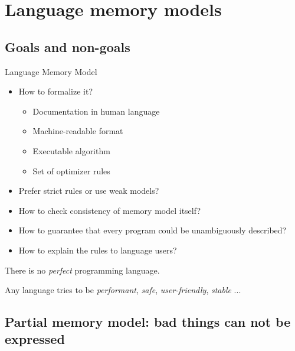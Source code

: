 \section{Language memory models}
\showTOCSub

\subsection{Goals and non-goals}


\begin{frame}{Language Memory Model}

\begin{itemize}
    \pause \item How to formalize it?
    \begin{itemize}
      \item Documentation in human language
      \item Machine-readable format
      \item Executable algorithm
      \item Set of optimizer rules
    \end{itemize}     
    \pause \item Prefer strict rules or use weak models?
    \pause \item How to check consistency of memory model itself?
    \pause \item How to guarantee that every program could be unambiguously described?
    \pause \item How to explain the rules to language users?
\end{itemize}

\pause

There is no \textit{perfect} programming language.

\pause

Any language tries to be \textit{performant}, \textit{safe}, \textit{user-friendly}, \textit{stable} ...

\end{frame}


\subsection{Partial memory model: bad things can not be expressed}
\showTOCSub

